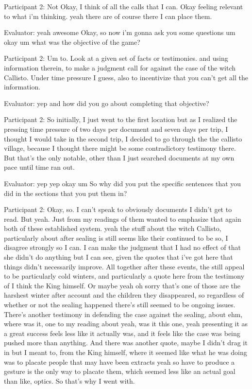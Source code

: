 \documentclass{l4proj}
\begin{document}
\begin{appendices}
Participant 2: Not Okay, I think of all the calls that I can. Okay feeling relevant to what i'm thinking. yeah there are of course there I can place them.

Evaluator: yeah awesome Okay, so now i'm gonna ask you some questions um okay um what was the objective of the game?

Participant 2: Um to. Look at a given set of facts or testimonies. and using information therein, to make a judgment call for against the case of the witch Callisto. Under time pressure I guess, also to incentivize that you can't get all the information.

Evaluator: yep and how did you go about completing that objective?

Participant 2: So initially, I just went to the first location but as I realized the pressing time pressure of two days per document and seven days per trip, I thought I would take in the second trip, I decided to go through the the callisto village, because I thought there might be some contradictory testimony there. But that’s the only notable,  other than I just searched documents at my own pace until time ran out.

Evaluator: yep yep okay um So why did you put the specific sentences that you did in the sections that you put them in?

 

Participant 2: Okay, so. I can't speak to obviously documents I didn't get to read. But yeah.
Just from my readings of them wanted to emphasize that again both of these established system. yeah the stuff about the witch Callisto, particularly about after sealing is still seems like their continued to be so, I disagree strongly so I can. I can make the judgment that I had no effect of that she didn't do anything but I can see, given the quotes that i've got here that things didn't necessarily improve. All together after these events, the still appeal to be particularly cold winters, and particularly a quote here from the testimony of I think the King himself. Or maybe yeah oh sorry that's one of those are the harshest winter after account and the children they disappeared, so regardless of whether or not the sealing happened there's still seemed to be ongoing issues. There’s another testimony in defending the case against the sealing, about ehm, where was it, one to my reading about yeah, was it this one, yeah presenting it as a great success feels less like it actually was, and it feels like the case was being pushed more than anything. And there was another quote, maybe I didn’t drag it in but I meant to, from the King himself, where it seemed like what he was doing was to placate people that may have been extracts yeah so have to produce a gesture is the only way to placate them, which seemed less like an actual goal than like, optics. So that’s why I went with. 
 


\end{appendices}
\end{document}
